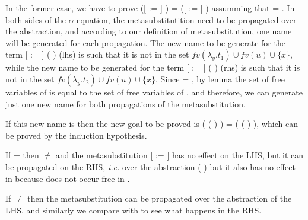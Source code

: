 In the former case, we have to prove  ([ := ]   ) = ([ := ]   ) assumming that  = . In both sides of the $\alpha$-equation, the metasubstitutition need to be propagated over the abstraction, and according to our definition of metasubstitution, one name will be generated for each propagation. The new name to be generate for the term [ := ] (  ) (lhs) is such that it is not in the set $fv(\lambda_y.t_1)\cup fv(u) \cup \{x\}$, while the new name to be generated for the term [ := ] (  ) (rhs) is such that it is not in the set $fv(\lambda_y.t_2)\cup fv(u) \cup \{x\}$. Since  = , by lemma  the set of free variables of  is equal to the set of free variables of , and therefore, we can generate just one new name for both propagations of the metasubstitution. 
\begin{coqdoccode}
\end{coqdoccode}
If this new name is  then the new goal to be proved is   ( (   )  ) =   ( (   )  ), which can be proved by the induction hypothesis. 
\begin{coqdoccode}
\end{coqdoccode}
If  =  then  \ensuremath{\not=}  and the metasubstitution [ := ] has no effect on the LHS, but it can be propagated on the RHS, {\it i.e.} over the abstraction (  ) but it also has no effect in  because  does not occur free in . 
\begin{coqdoccode}
\end{coqdoccode}
If  \ensuremath{\not=}  then the metasubstitution can be propagated over the abstraction of the LHS, and similarly we compare  with  to see what happens in the RHS. 
